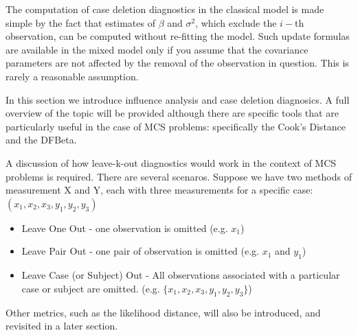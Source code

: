 \documentclass[12pt, a4paper]{report}
\theoremstyle{plain}
\theoremstyle{definition}
\theoremstyle{remark}
\begin{document}
	
	The computation of case deletion diagnostics in the classical model is made simple by the fact that estimates of $\beta$ and $\sigma^2$, which exclude the $i-$th observation, can be computed without re-fitting the model. Such update formulas are available in the mixed model only if you assume that the covariance parameters are not affected by the removal of the observation in question. This is rarely a reasonable assumption.
	
	
	
	In this section we introduce influence analysis and case deletion diagnosics. A full overview of the topic will be provided although there are specific tools that are particularly useful in the case of MCS problems: specifically the Cook's Distance and the DFBeta.
	
	A discussion of how leave-k-out diagnostics would work in the context of MCS problems is required. There are several scenaros. Suppose we have two methods of measurement X and Y, each with three measurements for a specific case: $(x_1,x_2,x_3,y_1,y_2,y_3)$
	
	\begin{itemize}
		\item Leave One Out - one observation is omitted (e.g. $x_1$)
		\item Leave Pair Out - one pair of observation  is omitted (e.g. $x_1$ and $y_1$)
		\item Leave Case (or Subject) Out - All observations associated with a particular case or subject are omitted. (e.g. $\{x_1,x_2,x_3,y_1,y_2,y_3\}$)
	\end{itemize}
	Other metrics, such as the likelihood distance, will also be introduced, and revisited in a later section.
	
	
	
	
\end{document}
